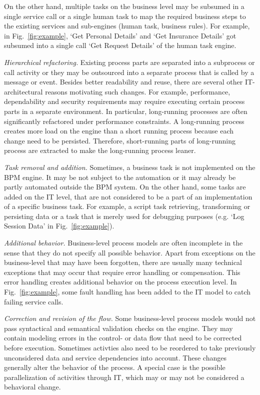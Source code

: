 {\begin{itemize*}
\begin{itemize*}
	  On the other hand, multiple tasks on the business level may be subsumed in a single service call or a single human task to map the required business steps to the existing services and sub-engines (human task, business rules). For example, in Fig.~\ref{fig:example}, `Get Personal Details' and `Get Insurance Details' got subsumed into a single call `Get Request Details' of the human task engine.
	  \item \emph{Hierarchical refactoring.} Existing process parts are separated into a subprocess or call activity or they may be outsourced into a separate process that is called by a message or event. Besides better readability and reuse, there are several other IT-architectural reasons motivating such changes. For example, performance, dependability and security requirements may require executing certain process parts in a separate environment. In particular, long-running processes are often significantly refactored under performance constraints. A long-running process creates more load on the engine than a short running process because each change need to be persisted. Therefore, short-running parts of long-running process are extracted to make the long-running process leaner.
	  \item \emph{Task removal and addition.} Sometimes, a business task is not implemented on the BPM engine. It may be not subject to the automation or it may already be partly automated outside the BPM system. On the other hand, some tasks are added on the IT level, that are not considered to be a part of an implementation of a specific business task. For example, a script task retrieving, transforming or persisting data or a task that is merely used for debugging purposes (e.g. `Log Session Data' in Fig.~\ref{fig:example}).
  \end{itemize*}
%
	\item \emph{Additional behavior.} Business-level process models are often incomplete in the sense that they do not specify all possible behavior. Apart from exceptions on the business-level that may have been forgotten, there are usually many technical exceptions that may occur that require error handling or compensation. This error handling creates additional behavior on the process execution level. In Fig.~\ref{fig:example}, some fault handling has been added to the IT model to catch failing service calls.
%
	\item \emph{Correction and revision of the flow.} Some business-level process models would not pass syntactical and semantical validation checks on the engine. They may contain modeling errors in the control- or data flow that need to be corrected before execution. Sometimes activties also need to be reordered to take previously unconsidered data and service dependencies into account. These changes generally alter the behavior of the process. A special case is the possible parallelization of activities through IT, which may or may not be considered a behavioral change.
\end{itemize*}
}

